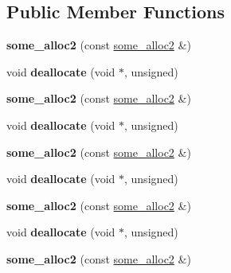 \subsection*{Public Member Functions}
\begin{DoxyCompactItemize}
\item 
\mbox{\label{structsome__alloc2_a23d3a873c40b971fb53239033725bd0f}} 
{\bfseries some\+\_\+alloc2} (const \mbox{\hyperlink{structsome__alloc2}{some\+\_\+alloc2}} \&)
\item 
\mbox{\label{structsome__alloc2_a5e5cb0fbe2fa946cd6af48e1a627ac42}} 
void {\bfseries deallocate} (void $\ast$, unsigned)
\item 
\mbox{\label{structsome__alloc2_a23d3a873c40b971fb53239033725bd0f}} 
{\bfseries some\+\_\+alloc2} (const \mbox{\hyperlink{structsome__alloc2}{some\+\_\+alloc2}} \&)
\item 
\mbox{\label{structsome__alloc2_a5e5cb0fbe2fa946cd6af48e1a627ac42}} 
void {\bfseries deallocate} (void $\ast$, unsigned)
\item 
\mbox{\label{structsome__alloc2_a23d3a873c40b971fb53239033725bd0f}} 
{\bfseries some\+\_\+alloc2} (const \mbox{\hyperlink{structsome__alloc2}{some\+\_\+alloc2}} \&)
\item 
\mbox{\label{structsome__alloc2_a5e5cb0fbe2fa946cd6af48e1a627ac42}} 
void {\bfseries deallocate} (void $\ast$, unsigned)
\item 
\mbox{\label{structsome__alloc2_a23d3a873c40b971fb53239033725bd0f}} 
{\bfseries some\+\_\+alloc2} (const \mbox{\hyperlink{structsome__alloc2}{some\+\_\+alloc2}} \&)
\item 
\mbox{\label{structsome__alloc2_a5e5cb0fbe2fa946cd6af48e1a627ac42}} 
void {\bfseries deallocate} (void $\ast$, unsigned)
\item 
\mbox{\label{structsome__alloc2_a23d3a873c40b971fb53239033725bd0f}} 
{\bfseries some\+\_\+alloc2} (const \mbox{\hyperlink{structsome__alloc2}{some\+\_\+alloc2}} \&)
\item 

\end{DoxyCompactItemize}
